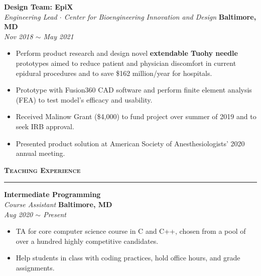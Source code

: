 \documentclass[10pt, letterpaper]{article}
\begin{document}
\begin{paracol}{2}
	\textbf{Design Team: EpiX}\\
	\textit{Engineering Lead $\cdot$ Center for Bioengineering Innovation and Design}
	\switchcolumn
	\raggedleft\textbf{Baltimore, MD}\\
	\raggedleft\textit{Nov 2018 $\sim$ May 2021}
\end{paracol}
\vspace{-5mm}
\begin{itemize}
	\item Perform product research and design novel \textbf{extendable Tuohy needle} 
	prototypes aimed to reduce patient and 
	physician discomfort in current epidural procedures and to save \$162 million/year for 
	hospitals.\vspace{-3mm}
	\item Prototype with Fusion360 CAD software and perform finite
	element analysis (FEA) to test model's efficacy and usability.\vspace{-3mm}
	\item Received Malinow Grant (\$4,000) to fund project over 
	summer of 2019 and to seek IRB approval.\vspace{-3mm}
	\item Presented product solution at American Society of Anesthesiologists' 2020 annual meeting. 
\end{itemize}
\vspace{-3mm} 


{\large \textbf{\textsc{Teaching Experience}}}
\vspace{5pt}
\hrule
\begin{paracol}{2}
	\textbf{Intermediate Programming}\\
	\textit{Course Assistant}
	\switchcolumn
	\raggedleft\textbf{Baltimore, MD}\\
	\raggedleft\textit{Aug 2020 $\sim$ Present}
\end{paracol}
\vspace{-5mm}
\begin{itemize}
	\item TA for core computer science course in C and C++, chosen from a pool of over a hundred highly competitive candidates.\vspace{-3mm}
	\item Help students in class with coding practices, hold office hours, and grade assignments.
\end{itemize}
\vspace{-3mm}
\end{document}
